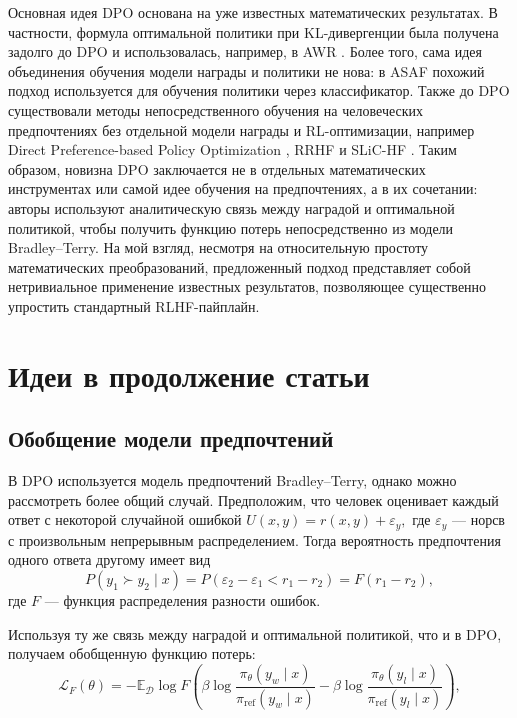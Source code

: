 \documentclass[11pt,a4paper]{article}
\theoremstyle{remark}
\begin{document}
Основная идея DPO основана на уже известных математических результатах. В частности, формула оптимальной политики при KL-дивергенции была получена задолго до DPO и использовалась, например, в AWR \cite{awr}. Более того, сама идея объединения обучения модели награды и политики не нова: в ASAF \cite{asaf} похожий подход используется для обучения политики через классификатор. Также до DPO существовали методы непосредственного обучения на человеческих предпочтениях без отдельной модели награды и RL-оптимизации, например Direct Preference-based Policy Optimization \cite{an2023}, RRHF \cite{rrhf} и SLiC-HF \cite{slic-hf}. Таким образом, новизна DPO заключается не в отдельных математических инструментах или самой идее обучения на предпочтениях, а в их сочетании: авторы используют аналитическую связь между наградой и оптимальной политикой, чтобы получить функцию потерь непосредственно из модели Bradley–Terry. На мой взгляд, несмотря на относительную простоту математических преобразований, предложенный подход представляет собой нетривиальное применение известных результатов, позволяющее существенно упростить стандартный RLHF-пайплайн.

\section{Идеи в продолжение статьи}

\subsection{Обобщение модели предпочтений}

В DPO используется модель предпочтений Bradley–Terry, однако можно рассмотреть более общий случай. Предположим, что человек оценивает каждый ответ с некоторой случайной ошибкой $U(x,y)=r(x,y)+\varepsilon_y,$
где \(\varepsilon_y\) — норсв с произвольным непрерывным распределением.
Тогда вероятность предпочтения одного ответа другому имеет вид
\[
P(y_1\succ y_2\mid x)
=P(\varepsilon_2-\varepsilon_1<r_1-r_2)
=F(r_1-r_2),
\]
где \(F\) — функция распределения разности ошибок.

Используя ту же связь между наградой и оптимальной политикой, что и в DPO, получаем обобщенную функцию потерь:
\[
\mathcal L_F(\theta)
=-\mathbb E_{\mathcal D}\log F(\beta\log\frac{\pi_\theta(y_w\mid x)}
{\pi_{\mathrm{ref}}(y_w\mid x)}
-\beta\log\frac{\pi_\theta(y_l\mid x)}
{\pi_{\mathrm{ref}}(y_l\mid x)}),
\]
\end{document}
